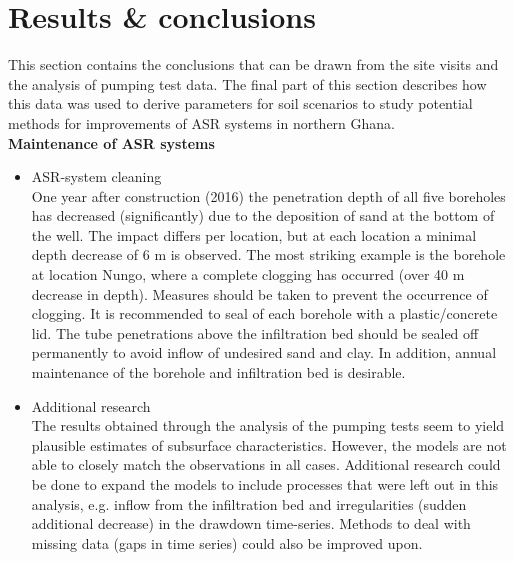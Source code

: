 \section{Results \& conclusions}
\label{section:fieldwork_conclusions}
This section contains the conclusions that can be drawn from the site visits and the analysis of pumping test data. The final part of this section describes how this data was used to derive parameters for soil scenarios to study potential methods for improvements of ASR systems in northern Ghana.  \\

\textbf{Maintenance of ASR systems}
\begin{itemize}
\item{ASR-system cleaning} \\
One year after construction (2016) the penetration depth of all five boreholes has decreased (significantly) due to the deposition of sand at the bottom of the well. The impact differs per location, but at each location a minimal depth decrease of 6 m is observed. The most striking example is the borehole at location Nungo, where a complete clogging has occurred (over 40 m decrease in depth). Measures should be taken to prevent the occurrence of clogging. It is recommended to seal of each borehole with a plastic/concrete lid. The tube penetrations above the infiltration bed should be sealed off permanently to avoid inflow of undesired sand and clay. In addition, annual maintenance of the borehole and infiltration bed is desirable.
         
\item{Additional research} \\
The results obtained through the analysis of the pumping tests seem to yield plausible estimates of subsurface characteristics. However, the models are not able to closely match the observations in all cases. Additional research could be done to expand the models to include processes that were left out in this analysis, e.g. inflow from the infiltration bed and irregularities (sudden additional decrease) in the drawdown time-series. Methods to deal with missing data (gaps in time series) could also be improved upon.
%


\end{itemize}
